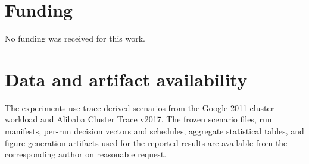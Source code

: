 \documentclass[preprint,12pt]{elsarticle}
\begin{document}
\section*{Funding}
No funding was received for this work.

\section*{Data and artifact availability}
The experiments use trace-derived scenarios from the Google 2011 cluster workload and Alibaba Cluster Trace v2017. The frozen scenario files, run manifests, per-run decision vectors and schedules, aggregate statistical tables, and figure-generation artifacts used for the reported results are available from the corresponding author on reasonable request.



\end{document}
